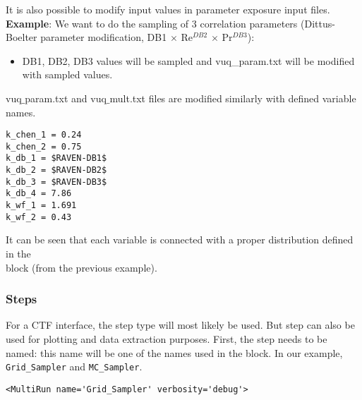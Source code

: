It is also possible to modify input values in parameter exposure input files.\\

\textbf{Example}:
We want to do the sampling of 3 correlation parameters (Dittus-Boelter parameter modification, DB1 $\times$ Re$^{DB2}$ $\times$ Pr$^{DB3}$):

\begin{itemize}
  \item DB1, DB2, DB3 values will be sampled and vuq\_param.txt will be modified with sampled values.
\end{itemize}

vuq$\_$param.txt and vuq$\_$mult.txt files are modified similarly with defined variable names.

\begin{lstlisting}[basicstyle=\tiny]
k_chen_1 = 0.24
k_chen_2 = 0.75
k_db_1 = $RAVEN-DB1$
k_db_2 = $RAVEN-DB2$
k_db_3 = $RAVEN-DB3$
k_db_4 = 7.86
k_wf_1 = 1.691
k_wf_2 = 0.43
\end{lstlisting}

\noindent It can be seen that each variable is connected with a proper distribution
defined in the \\ block (from the previous example).

\subsubsection{Steps}
For a CTF interface, the  step type will most likely be
used. But  step can also be used for plotting and data extraction purposes.
%
First, the step needs to be named: this name will be one of the names used in
the  block.
%
In our example, \texttt{Grid\_Sampler} and \texttt{MC\_Sampler}.
%
\begin{lstlisting}[style=XML,morekeywords={name,debug,re-seeding}]
     <MultiRun name='Grid_Sampler' verbosity='debug'>
\end{lstlisting}

